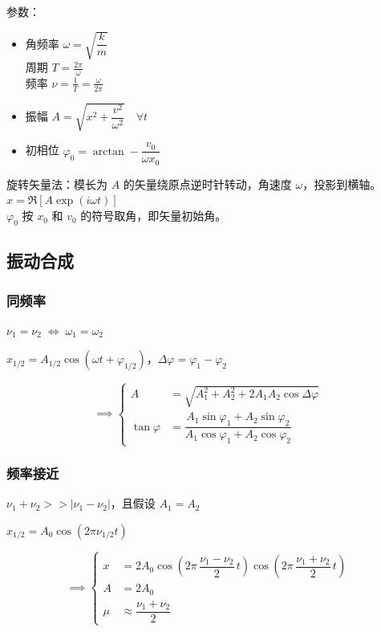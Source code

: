 \documentclass[12pt, a4paper, UTF8, openany]{ctexbook}
\begin{document}
        参数：
        \begin{itemize}
            \item 角频率 $\omega = \sqrt{\dfrac{k}{m}}$ \\
                周期 $T = \frac{2\pi}{\omega}$ \\
                频率 $\nu = \frac{1}{T} = \frac{\omega}{2\pi}$
            \item 振幅 $A = \sqrt{x^2 + \dfrac{v^2}{\omega^2}} \quad \forall t$
            \item 初相位 $\varphi_0 = \arctan -\dfrac{v_0}{\omega x_0}$
        \end{itemize}

        旋转矢量法：模长为 $A$ 的矢量绕原点逆时针转动，角速度 $\omega$，投影到横轴。$x = \Re[A \exp(i \omega t)]$ \\
        $\varphi_0$ 按 $x_0$ 和 $v_0$ 的符号取角，即矢量初始角。

        \subsection{振动合成}
        \subsubsection{同频率}
        $\nu_1 = \nu_2 \; \iff \; \omega_1 = \omega_2$

        $x_{1/2} = A_{1/2} \cos(\omega t + \varphi_{1/2})$，$\Delta\varphi = \varphi_1 - \varphi_2$

        $$\implies\begin{cases}
            A &= \sqrt{A_1^2 + A_2^2 + 2A_1A_2\cos\Delta\varphi} \\
            \tan\varphi &= \dfrac{A_1\sin\varphi_1 + A_2\sin\varphi_2}{A_1\cos\varphi_1 + A_2\cos\varphi_2}
        \end{cases}$$

        \subsubsection{频率接近}
        $\nu_1 + \nu_2 >> |\nu_1 - \nu_2|$，且假设 $A_1 = A_2$
        
        $x_{1/2} = A_0 \cos(2\pi\nu_{1/2}t)$

        $$\implies\begin{cases}
            x &= 2A_0 \cos(2\pi \, \dfrac{\nu_1 - \nu_2}{2} \, t) \cos(2\pi \, \dfrac{\nu_1 + \nu_2}{2} \, t) \\
            A &= 2A_0 \\
            \mu &\approx \dfrac{\nu_1 + \nu_2}{2}
        \end{cases}$$
\end{document}
